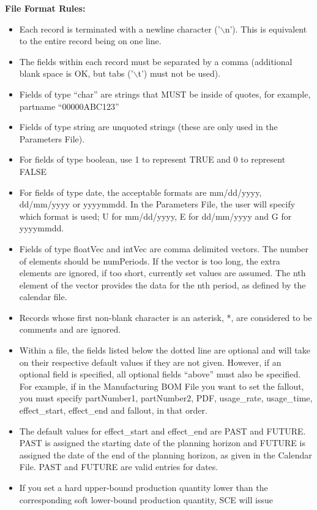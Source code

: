 \noindent
{\bf File Format Rules:}
\begin{itemize}
\item Each record is terminated with a newline character ('$\backslash$n').  This is
  equivalent to the entire record being on one line.
\item The fields within each record must be separated by a comma (additional
  blank space is OK, but tabs ('$\backslash$t') must not be used).
\item Fields of type ``char'' are strings that MUST be inside of quotes, for example,
  partname ``00000ABC123''
\item Fields of type string are unquoted strings (these are only used
  in the Parameters File).
\item For fields of type boolean, use 1 to represent TRUE and 0 to
  represent FALSE
\item For fields of type date, the acceptable formats are mm/dd/yyyy, 
  dd/mm/yyyy or yyyymmdd.  In the Parameters File, the user will specify which
  format is used;  U for mm/dd/yyyy, E for dd/mm/yyyy and G for yyyymmdd.
\item Fields of type floatVec and intVec are comma delimited vectors.
  The number of elements should be numPeriods.  If the vector is too
  long, the extra elements are ignored, if too short,  currently set
  values are assumed.  The nth element of the vector provides the
  data for the nth period, as defined by the calendar file.
\item Records whose first non-blank character is an asterisk, *, are 
  considered to be comments and are ignored.
\item Within a file, the fields listed below the dotted line are optional and
 will take on their respective default values if they are not given.  However,
 if an optional field is specified, all optional fields ``above'' must also be
 specified.  For example, if in the Manufacturing BOM File you want to set the
 fallout, you must specify partNumber1, partNumber2, PDF, usage\_rate, 
 usage\_time, effect\_start, effect\_end and fallout, in that order.
\item The default values for effect\_start and effect\_end are PAST and FUTURE.
PAST is assigned the starting date of the planning horizon
and FUTURE is assigned the date of the end of the 
planning horizon, as given in the Calendar File.  PAST and FUTURE are valid entries
for dates.
\item If you set a hard upper-bound production quantity lower than 
the corresponding soft lower-bound production quantity, SCE will issue

\end{itemize}
